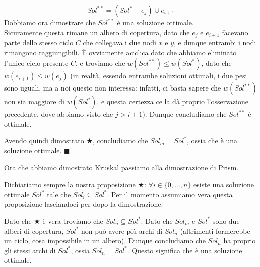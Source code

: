 \documentclass[11pt, a4paper, titlepage, oneside]{scrbook}
\begin{document}
\begin{itemize}
\begin{itemize}
\begin{itemize}
            \[Sol^{**} = (Sol^* - e_j) \cup e_{i+1} \]
            Dobbiamo ora dimostrare che $Sol^{**}$ è una soluzione ottimale. \\
            Sicuramente questa rimane un albero di copertura, dato che $e_j$ e $e_{i+1}$ facevano parte dello stesso ciclo $C$ che collegava i due nodi $x$ e $y$, e dunque entrambi i nodi rimangono raggiungibili. È ovviamente aciclica dato che abbiamo eliminato l'unico ciclo presente $C$, e troviamo che $w(Sol^{**}) \leq w (Sol^*)$, dato che $w(e_{i+1}) \leq w(e_j)$ (in realtà, essendo entrambe soluzioni ottimali, i due pesi sono uguali, ma a noi questo non interessa: infatti, ci basta sapere che $w(Sol^{**})$ non sia maggiore di $w(Sol^*)$, e questa certezza ce la dà proprio l'osservazione precedente, dove abbiamo visto che $j > i + 1$). Dunque concludiamo che $Sol^{**}$ è ottimale. 
            \end{itemize}
    \end{itemize}
\end{itemize}

Avendo quindi dimostrato $\bigstar$, concludiamo che $Sol_m = Sol^*$, ossia che  è una soluzione ottimale. $\blacksquare$

Ora che abbiamo dimostrato Kruskal passiamo alla dimostrazione di Prism.

\Dimostrazione \nopagebreak

Dichiariamo sempre la nostra proposizione $\bigstar$: $\forall i \in \{0, \ldots, n\}$ esiste una soluzione ottimale $Sol^*$ tale che $Sol_i \subseteq Sol^*$. Per il momento assumiamo vera questa proposizione lasciandoci per dopo la dimostrazione. 

Dato che $\bigstar$ è vera troviamo che $Sol_n \subseteq Sol^*$. Dato che $Sol_m$ e $Sol^*$ sono due alberi di copertura, $Sol^*$ non può avere più archi di $Sol_n$ (altrimenti formerebbe un ciclo, cosa impossibile in un albero). Dunque concludiamo che $Sol_n$ ha proprio gli stessi archi di $Sol^*$, ossia $Sol_n = Sol^*$. Questo significa che  è una soluzione ottimale.
\end{document}
